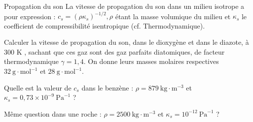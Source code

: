 \begin{exo}[PC][1][colle]{Propagation du son}
La vitesse de propagation du son dans un milieu isotrope a pour expression : $c_{s}=\left(\rho \kappa_{s}\right)^{-1 / 2}, \rho$ étant la masse volumique du milieu et $\kappa_{s}$ le coefficient de compressibilité isentropique (cf. Thermodynamique).

\begin{quest}
  \item Calculer la vitesse de propagation du son, dans le dioxygène et dans le diazote, à 300 K , sachant que ces gaz sont des gaz parfaits diatomiques, de facteur thermodynamique $\gamma=1,4$. On donne leurs masses molaires respectives $32 \mathrm{~g} \cdot \mathrm{mol}^{-1}$ et $28 \mathrm{~g} \cdot \mathrm{mol}^{-1}$.

  \item Quelle est la valeur de $c_{s}$ dans le benzène : $\rho=879 \mathrm{~kg} \cdot \mathrm{m}^{-3}$ et $\kappa_{s}=0,73 \times 10^{-9} \mathrm{~Pa}^{-1}$ ?

  \item Même question dans une roche : $\rho=2500 \mathrm{~kg} \cdot \mathrm{m}^{-3}$ et $\kappa_{s}=10^{-12} \mathrm{~Pa}^{-1}$ ?

\end{quest}
\end{exo}


  
